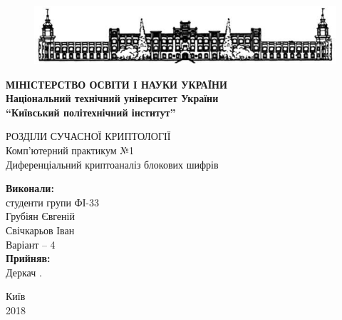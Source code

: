 \documentclass[12pt,a4paper]{article}
\begin{document}
\begin{titlepage}
  \begin{center}

\begin{figure}
  \centering
    \includegraphics{shapkaKPI}
\end{figure}

 \Large \textbf{МІНІСТЕРСТВО ОСВІТИ І НАУКИ УКРАЇНИ}\\
      \textbf{ Національний технічний університет України\\
      “Київський політехнічний інститут”}\\

       \vspace{2 cm}
    
РОЗДІЛИ СУЧАСНОЇ КРИПТОЛОГІЇ\\
Комп’ютерний практикум №1\\
\vspace{1 cm}
Диференціальний криптоаналіз блокових шифрів \\
    \vfill
    \vfill
  
\newlength{\ML}
\hfill\begin{minipage}{0.4\textwidth}
 \textbf{Виконали:}\\
 студенти групи ФІ-33\\
 Грубіян Євгеній\\
 Свічкарьов Іван\\
 Варіант -- 4 \\
 \textbf{Прийняв:}\\
 Деркач .\\
\end{minipage}%
\vfill
\vfill  
 

  
\begin{center}
  Київ\\
  2018
\end{center}
\end{center}
\end{titlepage}

\setcounter{page}{2} %
\end{document}
